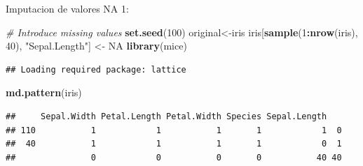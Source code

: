 \documentclass[ignorenonframetext,]{beamer}
\newenvironment{Shaded}{\begin{snugshade}}{\end{snugshade}}
\newcommand{\KeywordTok}[1]{\textcolor[rgb]{0.13,0.29,0.53}{\textbf{#1}}}
\newcommand{\DecValTok}[1]{\textcolor[rgb]{0.00,0.00,0.81}{#1}}
\newcommand{\StringTok}[1]{\textcolor[rgb]{0.31,0.60,0.02}{#1}}
\newcommand{\CommentTok}[1]{\textcolor[rgb]{0.56,0.35,0.01}{\textit{#1}}}
\newcommand{\OtherTok}[1]{\textcolor[rgb]{0.56,0.35,0.01}{#1}}
\newcommand{\OperatorTok}[1]{\textcolor[rgb]{0.81,0.36,0.00}{\textbf{#1}}}
\newcommand{\NormalTok}[1]{#1}
\begin{document}
\begin{frame}[fragile]{Imputacion de valores NA 1:}

\begin{Shaded}
\begin{Highlighting}[]
\CommentTok{# Introduce missing values}
\KeywordTok{set.seed}\NormalTok{(}\DecValTok{100}\NormalTok{)}
\NormalTok{original<-iris}
\NormalTok{iris[}\KeywordTok{sample}\NormalTok{(}\DecValTok{1}\OperatorTok{:}\KeywordTok{nrow}\NormalTok{(iris), }\DecValTok{40}\NormalTok{), }\StringTok{"Sepal.Length"}\NormalTok{] <-}\StringTok{ }\OtherTok{NA}
\KeywordTok{library}\NormalTok{(mice)}
\end{Highlighting}
\end{Shaded}

\begin{verbatim}
## Loading required package: lattice
\end{verbatim}

\begin{Shaded}
\begin{Highlighting}[]
\KeywordTok{md.pattern}\NormalTok{(iris)}
\end{Highlighting}
\end{Shaded}

\begin{verbatim}
##     Sepal.Width Petal.Length Petal.Width Species Sepal.Length   
## 110           1            1           1       1            1  0
##  40           1            1           1       1            0  1
##               0            0           0       0           40 40
\end{verbatim}

\end{frame}
\end{document}
